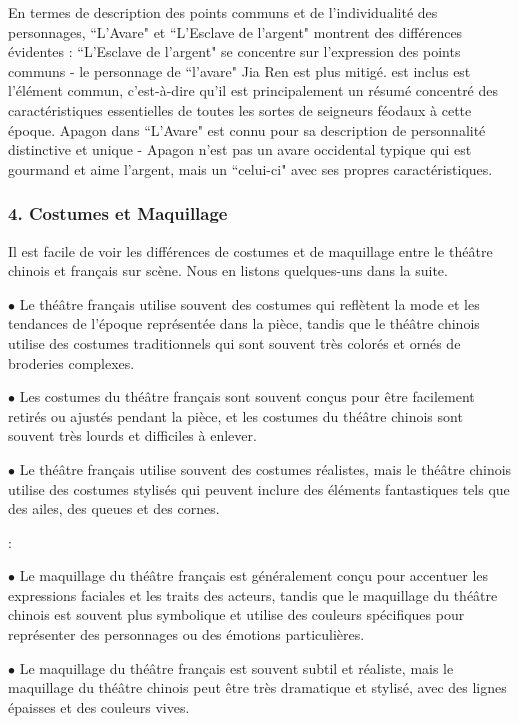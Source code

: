\documentclass[UTF8,a4paper,12pt]{ctexart}
\numberwithin{equation}{section}
\begin{document}
En termes de description des points communs et de l'individualité des personnages, ``L'Avare" et ``L'Esclave de l'argent" montrent des différences évidentes : ``L'Esclave de l'argent" se concentre sur l'expression des points communs - le personnage de ``l'avare" Jia Ren est plus mitigé. est inclus est l'élément commun, c'est-à-dire qu'il est principalement un résumé concentré des caractéristiques essentielles de toutes les sortes de seigneurs féodaux à cette époque. Apagon dans ``L'Avare" est connu pour sa description de personnalité distinctive et unique - Apagon n'est pas un avare occidental typique qui est gourmand et aime l'argent, mais un ``celui-ci" avec ses propres caractéristiques.

\subsubsection*{4. Costumes et Maquillage}
Il est facile de voir les différences de costumes et de maquillage entre le théâtre chinois et français sur scène. Nous en listons quelques-uns dans la suite.


$\bullet$ Le théâtre français utilise souvent des costumes qui reflètent la mode et les tendances de l'époque représentée dans la pièce, tandis que le théâtre chinois utilise des costumes traditionnels qui sont souvent très colorés et ornés de broderies complexes.

$\bullet$ Les costumes du théâtre français sont souvent conçus pour être facilement retirés ou ajustés pendant la pièce, et les costumes du théâtre chinois sont souvent très lourds et difficiles à enlever.

$\bullet$ Le théâtre français utilise souvent des costumes réalistes, mais le théâtre chinois utilise des costumes stylisés qui peuvent inclure des éléments fantastiques tels que des ailes, des queues et des cornes.

:

$\bullet$ Le maquillage du théâtre français est généralement conçu pour accentuer les expressions faciales et les traits des acteurs, tandis que le maquillage du théâtre chinois est souvent plus symbolique et utilise des couleurs spécifiques pour représenter des personnages ou des émotions particulières.

$\bullet$ Le maquillage du théâtre français est souvent subtil et réaliste, mais le maquillage du théâtre chinois peut être très dramatique et stylisé, avec des lignes épaisses et des couleurs vives.
\end{document}
